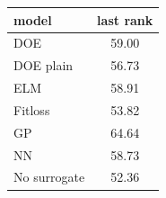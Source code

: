 \begin{tabular}{|lc|}
\hline
model & last rank\\
\hline
DOE & 59.00 \\
DOE plain & 56.73 \\
ELM & 58.91 \\
Fitloss & 53.82 \\
GP & 64.64 \\
NN & 58.73 \\
No surrogate & 52.36 \\
\hline
\end{tabular}
